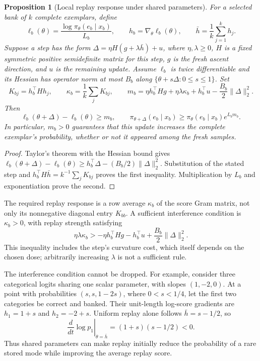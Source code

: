 \documentclass{article}
\newcommand{\enforcehalffinalproseline}{%
  \setlength{\parfillskip}{0pt plus .20\linewidth}}
\newcommand{\1}{\mathbf 1}
\newtheorem{proposition}[lemma]{Proposition}
\theoremstyle{remark}
\theoremstyle{definition}
\theoremstyle{plain}
\begin{document}
\begin{proposition}[Local replay response under shared parameters]
\enforcehalffinalproseline
\label{prop:neural-replay-local-response}
For a selected bank of $k$ complete exemplars, define
\[
 \ell_b(\theta)=\frac{\log\pi_\theta(e_b\mid x_b)}{L_b},\qquad
 h_b=\nabla_\theta\ell_b(\theta),\qquad
 \bar h=\frac1k\sum_{j=1}^k h_j.
\]
Suppose a step has the form
$\Delta=\eta H(g+\lambda\bar h)+u$, where $\eta,\lambda\ge0$,
$H$ is a fixed symmetric positive semidefinite matrix for this step,
$g$ is the fresh ascent direction, and $u$ is the remaining update.
Assume $\ell_b$ is twice differentiable and its Hessian has operator norm
at most $B_b$ along $\{\theta+s\Delta:0\le s\le1\}$.
Set
\[
 K_{bj}=h_b^\top Hh_j,\qquad
 \kappa_b=\frac1k\sum_jK_{bj},\qquad
 m_b=\eta h_b^\top Hg+\eta\lambda\kappa_b
       +h_b^\top u-\frac{B_b}{2}\|\Delta\|_2^2.
\]
Then
\begin{equation}
 \ell_b(\theta+\Delta)-\ell_b(\theta)\ge m_b,
 \qquad
 \pi_{\theta+\Delta}(e_b\mid x_b)
    \ge\pi_\theta(e_b\mid x_b)e^{L_bm_b}.
 \label{eq:neural-replay-local-response}
\end{equation}
In particular, $m_b>0$ guarantees that this update increases the complete
exemplar's probability, whether or not it appeared among the fresh samples.
\end{proposition}

\begin{proof}
\enforcehalffinalproseline
Taylor's theorem with the Hessian bound gives
$\ell_b(\theta+\Delta)-\ell_b(\theta)
 \ge h_b^\top\Delta-(B_b/2)\|\Delta\|_2^2$.
Substitution of the stated step and
$h_b^\top H\bar h=k^{-1}\sum_jK_{bj}$ proves the first inequality.
Multiplication by $L_b$ and exponentiation prove the second.
\end{proof}

The required replay response is a row average $\kappa_b$ of the score Gram
matrix, not only its nonnegative diagonal entry $K_{bb}$. A sufficient
interference condition is $\kappa_b>0$, with replay strength satisfying
\[
 \eta\lambda\kappa_b>
   -\eta h_b^\top Hg-h_b^\top u
       +\frac{B_b}{2}\|\Delta\|_2^2.
\]
This inequality includes the step's curvature cost, which itself depends on
the chosen dose; arbitrarily increasing $\lambda$ is not a sufficient rule.

The interference condition cannot be dropped. For example, consider three
categorical logits sharing one scalar parameter, with slopes $(1,-2,0)$.
At a point with probabilities $(s,s,1-2s)$, where $0<s<1/4$, let the first
two categories be correct and banked. Their unit-length log-score gradients
are $h_1=1+s$ and $h_2=-2+s$. Uniform replay alone follows
$\bar h=s-1/2$, so
\[
 \left.\frac{d}{dt}\log p_1\right|_{\dot\theta=\bar h}
   =(1+s)(s-1/2)<0.
\]
Thus shared parameters can make replay initially reduce the probability of
a rare stored mode while improving the average replay score.
\end{document}

